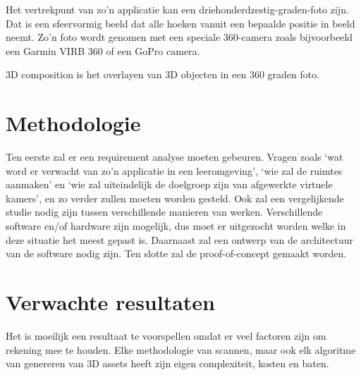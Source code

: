 \documentclass{hogent-article}
\begin{document}
Het vertrekpunt van zo’n applicatie kan een driehonderdzestig-graden-foto zijn. Dat is een sfeervormig beeld dat alle hoeken vanuit een bepaalde positie in beeld neemt. Zo’n foto wordt genomen met een speciale 360-camera zoals bijvoorbeeld een Garmin VIRB 360 of een GoPro camera.

3D composition is het overlayen van 3D objecten in een 360 graden foto.


\section{Methodologie}%
\label{sec:methodologie}


    Ten eerste zal er een requirement analyse moeten gebeuren. Vragen zoals ‘wat word er verwacht van zo’n applicatie in een leeromgeving’, ‘wie zal de ruimtes aanmaken’ en ‘wie zal uiteindelijk de doelgroep zijn van afgewerkte virtuele kamers’, en zo verder zullen moeten worden gesteld. Ook zal een vergelijkende studie nodig zijn tussen verschillende manieren van werken. Verschillende software en/of hardware zijn mogelijk, dus moet er uitgezocht worden welke in deze situatie het meest gepast is. Daarnaast zal een ontwerp van de architectuur van de software nodig zijn. Ten slotte zal de proof-of-concept gemaakt worden.

\section{Verwachte resultaten}%
\label{sec:verwachte-resultaten}


Het is moeilijk een resultaat te voorspellen omdat er veel factoren zijn om rekening mee te houden. Elke methodologie van scannen, maar ook elk algoritme van genereren van 3D assets heeft zijn eigen complexiteit, kosten en baten. 
\end{document}
